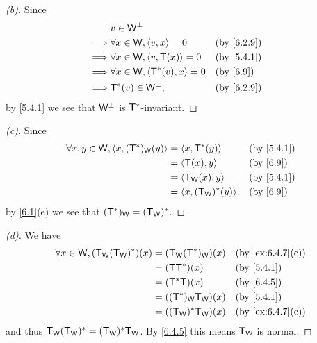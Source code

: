 \begin{proof}[(b)]
  Since
  \begin{align*}
             & v \in \W^{\perp}                                       \\
    \implies & \forall x \in \W, \inn{v, x} = 0       &  & \by{6.2.9} \\
    \implies & \forall x \in \W, \inn{v, \T(x)} = 0   &  & \by{5.4.1} \\
    \implies & \forall x \in \W, \inn{\T^*(v), x} = 0 &  & \by{6.9}   \\
    \implies & \T^*(v) \in \W^{\perp},                &  & \by{6.2.9}
  \end{align*}
  by \cref{5.4.1} we see that \(\mathsf{W}^{\perp}\) is \(\mathsf{T}^*\)-invariant.
\end{proof}

\begin{proof}[(c)]
  Since
  \begin{align*}
    \forall x, y \in \W, \inn{x, (\T^*)_{\W}(y)} & = \inn{x, \T^*(y)}         &  & \by{5.4.1} \\
                                                 & = \inn{\T(x), y}           &  & \by{6.9}   \\
                                                 & = \inn{\T_{\W}(x), y}      &  & \by{5.4.1} \\
                                                 & = \inn{x, (\T_{\W})^*(y)}, &  & \by{6.9}
  \end{align*}
  by \cref{6.1}(e) we see that \((\mathsf{T}^*)_{\mathsf{W}} = (\mathsf{T}_{\mathsf{W}})^*\).
\end{proof}

\begin{proof}[(d)]
  We have
  \begin{align*}
    \forall x \in \W, (\T_{\W} (\T_{\W})^*)(x) & = (\T_{\W} (\T^*)_{\W})(x) &  & \by{ex:6.4.7}[c] \\
                                               & = (\T \T^*)(x)             &  & \by{5.4.1}       \\
                                               & = (\T^* \T)(x)             &  & \by{6.4.5}       \\
                                               & = ((\T^*)_{\W} \T_{\W})(x) &  & \by{5.4.1}       \\
                                               & = ((\T_{\W})^* \T_{\W})(x) &  & \by{ex:6.4.7}[c]
  \end{align*}
  and thus \(\mathsf{T}_{\mathsf{W}} (\mathsf{T}_{\mathsf{W}})^* = (\mathsf{T}_{\mathsf{W}})^* \mathsf{T}_{\mathsf{W}}\).
  By \cref{6.4.5} this means \(\mathsf{T}_{\mathsf{W}}\) is normal.
\end{proof}

